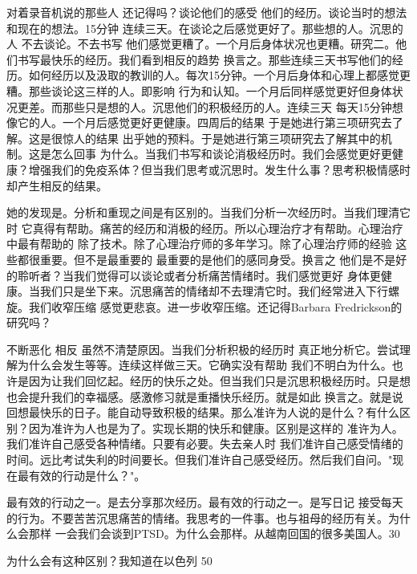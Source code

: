 对着录音机说的那些人 还记得吗？谈论他们的感受 他们的经历。谈论当时的想法和现在的想法。15分钟 连续三天。在谈论之后感觉更好了。那些想的人。沉思的人 不去谈论。不去书写 他们感觉更糟了。一个月后身体状况也更糟。研究二。他们书写最快乐的经历。我们看到相反的趋势 换言之。那些连续三天书写他们的经历。如何经历以及汲取的教训的人。每次15分钟。一个月后身体和心理上都感觉更糟。那些谈论这三样的人。即影响 行为和认知。一个月后同样感觉更好但身体状况更差。而那些只是想的人。沉思他们的积极经历的人。连续三天 每天15分钟想像它的人。一个月后感觉更好更健康。四周后的结果 于是她进行第三项研究去了解。这是很惊人的结果 出乎她的预料。于是她进行第三项研究去了解其中的机制。这是怎么回事 为什么。当我们书写和谈论消极经历时。我们会感觉更好更健康？增强我们的免疫系体？但当我们思考或沉思时。发生什么事？思考积极情感时却产生相反的结果。 

她的发现是。分析和重现之间是有区别的。当我们分析一次经历时。当我们理清它时 它真得有帮助。痛苦的经历和消极的经历。所以心理治疗才有帮助。心理治疗中最有帮助的 除了技术。除了心理治疗师的多年学习。除了心理治疗师的经验 这些都很重要。但不是最重要的 最重要的是他们的感同身受。换言之 他们是不是好的聆听者？当我们觉得可以谈论或者分析痛苦情绪时。我们感觉更好 身体更健康。当我们只是坐下来。沉思痛苦的情绪却不去理清它时。我们经常进入下行螺旋。我们收窄压缩 感觉更悲哀。进一步收窄压缩。还记得Barbara Fredrickson的研究吗？ 

不断恶化 相反 虽然不清楚原因。当我们分析积极的经历时 真正地分析它。尝试理解为什么会发生等等。连续这样做三天。它确实没有帮助 我们不明白为什么。也许是因为让我们回忆起。经历的快乐之处。但当我们只是沉思积极经历时。只是想也会提升我们的幸福感。感激修习就是重播快乐经历。就是如此 换言之。就是说回想最快乐的日子。能自动导致积极的结果。那么准许为人说的是什么？有什么区别？因为准许为人也是为了。实现长期的快乐和健康。区别是这样的 准许为人。我们准许自己感受各种情绪。只要有必要。失去亲人时 我们准许自己感受情绪的时间。远比考试失利的时间要长。但我们准许自己感受经历。然后我们自问。"现在最有效的行动是什么？"。 

最有效的行动之一。是去分享那次经历。最有效的行动之一。是写日记 接受每天的行为。不要苦苦沉思痛苦的情绪。我思考的一件事。也与祖母的经历有关。为什么会那样 一会我们会谈到PTSD。为什么会那样。从越南回国的很多美国人。30%

为什么会有这种区别？我知道在以色列 50%

